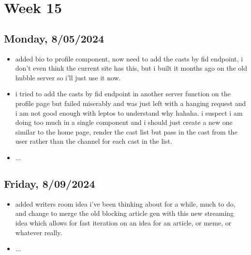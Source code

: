 \newpage
\section{Week 15}

\subsection*{Monday, 8/05/2024}
\begin{itemize}
    \item added bio to profile component, now need to add the casts by fid
        endpoint, i don't even think the current site has this, but i built it
        months ago on the old hubble server so i'll just use it now.
    \item i tried to add the casts by fid endpoint in another server function on
        the profile page but failed miserably and was just left with a hanging
        request and i am not good enough with leptos to understand why hahaha. i
        suspect i am doing too much in a single component and i should just
        create a new one similar to the home page, render the cast list but pass
        in the cast from the user rather than the channel for each cast in the
        list.
    \item ...
\end{itemize}

\subsection*{Friday, 8/09/2024}
\begin{itemize}
    \item added writers room idea i've been thinking about for a while, much to
        do, and change to merge the old blocking article gen with this new
        streaming idea which allows for fast iteration on an idea for an
        article, or meme, or whatever really.
    \item ...
\end{itemize}
